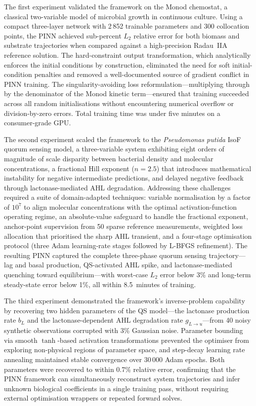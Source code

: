 \documentclass[14pt,a4paper,openany]{extbook}
\begin{document}
The first experiment validated the framework on the Monod chemostat, a classical two-variable model of microbial growth in continuous culture. Using a compact three-layer network with 2\,852 trainable parameters and 300 collocation points, the PINN achieved sub-percent $L_2$ relative error for both biomass and substrate trajectories when compared against a high-precision Radau~IIA reference solution. The hard-constraint output transformation, which analytically enforces the initial conditions by construction, eliminated the need for soft initial-condition penalties and removed a well-documented source of gradient conflict in PINN training. The singularity-avoiding loss reformulation---multiplying through by the denominator of the Monod kinetic term---ensured that training succeeded across all random initialisations without encountering numerical overflow or division-by-zero errors. Total training time was under five minutes on a consumer-grade GPU.

The second experiment scaled the framework to the \textit{Pseudomonas putida} IsoF quorum sensing model, a three-variable system exhibiting eight orders of magnitude of scale disparity between bacterial density and molecular concentrations, a fractional Hill exponent ($n = 2.5$) that introduces mathematical instability for negative intermediate predictions, and delayed negative feedback through lactonase-mediated AHL degradation. Addressing these challenges required a suite of domain-adapted techniques: variable normalisation by a factor of $10^7$ to align molecular concentrations with the optimal activation-function operating regime, an absolute-value safeguard to handle the fractional exponent, anchor-point supervision from 50 sparse reference measurements, weighted loss allocation that prioritised the sharp AHL transient, and a four-stage optimisation protocol (three Adam learning-rate stages followed by L-BFGS refinement). The resulting PINN captured the complete three-phase quorum sensing trajectory---lag and basal production, QS-activated AHL spike, and lactonase-mediated quenching toward equilibrium---with worst-case $L_2$ error below 3\% and long-term steady-state error below 1\%, all within 8.5~minutes of training.

The third experiment demonstrated the framework's inverse-problem capability by recovering two hidden parameters of the QS model---the lactonase production rate $b_L$ and the lactonase-dependent AHL degradation rate $g_{L \to u}$---from 40 noisy synthetic observations corrupted with 3\% Gaussian noise. Parameter bounding via smooth $\tanh$-based activation transformations prevented the optimiser from exploring non-physical regions of parameter space, and step-decay learning rate annealing maintained stable convergence over 30\,000 Adam epochs. Both parameters were recovered to within 0.7\% relative error, confirming that the PINN framework can simultaneously reconstruct system trajectories and infer unknown biological coefficients in a single training pass, without requiring external optimisation wrappers or repeated forward solves.
\end{document}
